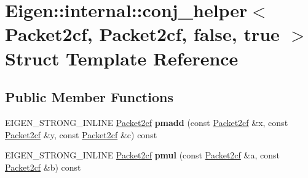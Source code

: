 \hypertarget{struct_eigen_1_1internal_1_1conj__helper_3_01_packet2cf_00_01_packet2cf_00_01false_00_01true_01_4}{}\section{Eigen\+::internal\+::conj\+\_\+helper$<$ Packet2cf, Packet2cf, false, true $>$ Struct Template Reference}
\label{struct_eigen_1_1internal_1_1conj__helper_3_01_packet2cf_00_01_packet2cf_00_01false_00_01true_01_4}
\subsection*{Public Member Functions}
\begin{DoxyCompactItemize}
\item 
\mbox{\label{struct_eigen_1_1internal_1_1conj__helper_3_01_packet2cf_00_01_packet2cf_00_01false_00_01true_01_4_a39029f97833eb088f1a544ad8bfd6523}} 
E\+I\+G\+E\+N\+\_\+\+S\+T\+R\+O\+N\+G\+\_\+\+I\+N\+L\+I\+NE \mbox{\hyperlink{struct_eigen_1_1internal_1_1_packet2cf}{Packet2cf}} {\bfseries pmadd} (const \mbox{\hyperlink{struct_eigen_1_1internal_1_1_packet2cf}{Packet2cf}} \&x, const \mbox{\hyperlink{struct_eigen_1_1internal_1_1_packet2cf}{Packet2cf}} \&y, const \mbox{\hyperlink{struct_eigen_1_1internal_1_1_packet2cf}{Packet2cf}} \&c) const
\item 
\mbox{\label{struct_eigen_1_1internal_1_1conj__helper_3_01_packet2cf_00_01_packet2cf_00_01false_00_01true_01_4_a862dc97e126dc92a670828ee289031ec}} 
E\+I\+G\+E\+N\+\_\+\+S\+T\+R\+O\+N\+G\+\_\+\+I\+N\+L\+I\+NE \mbox{\hyperlink{struct_eigen_1_1internal_1_1_packet2cf}{Packet2cf}} {\bfseries pmul} (const \mbox{\hyperlink{struct_eigen_1_1internal_1_1_packet2cf}{Packet2cf}} \&a, const \mbox{\hyperlink{struct_eigen_1_1internal_1_1_packet2cf}{Packet2cf}} \&b) const
\item 
\mbox{\label{struct_eigen_1_1internal_1_1conj__helper_3_01_packet2cf_00_01_packet2cf_00_01false_00_01true_01_4_a39029f97833eb088f1a544ad8bfd6523}} 

\end{DoxyCompactItemize}

